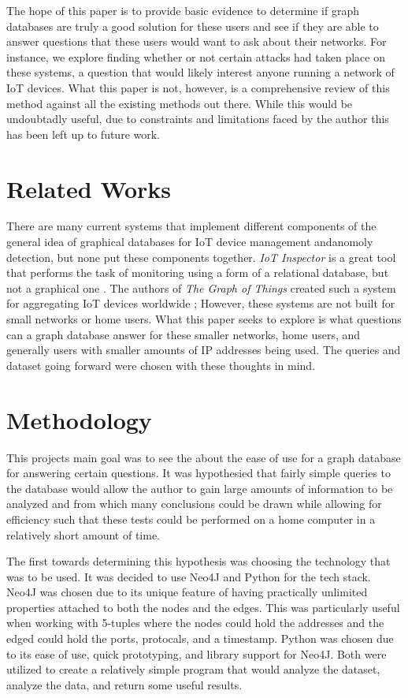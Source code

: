 \documentclass[conference]{IEEEtran}
\begin{document}
The hope of this paper is to provide basic evidence to determine if graph databases are truly a good solution 
for these users and see if they are able to answer questions that these users would want to ask about their 
networks. For instance, we explore finding whether or not certain attacks had taken place on these systems,
a question that would likely interest anyone running a network of IoT devices. What this paper is not, however,
is a comprehensive review of this method against all the existing methods out there. While this would be
undoubtadly useful, due to constraints and limitations faced by the author this has been left up to future work.

\section{Related Works}
There are many current systems that implement different components of the general idea of graphical databases for
IoT device management andanomoly detection, but none put these components together. \textit{IoT Inspector} is a great
tool that performs the task of monitoring using a form of a relational database, but not a graphical one \cite{IoTInspector}.
The authors of \textit{The Graph of Things} created such a system for aggregating IoT devices worldwide \cite{GraphofThings}; 
However, these systems are not built for small networks or home users. What this paper seeks to explore is what questions
can a graph database answer for these smaller networks, home users, and generally users with smaller amounts of
IP addresses being used. The queries and dataset going forward were chosen with these thoughts in mind.
 
\section{Methodology}
This projects main goal was to see the about the ease of use for a graph database for answering certain questions.
It was hypothesied that fairly simple queries to the database would allow the author to gain large amounts of
information to be analyzed and from which many conclusions could be drawn while allowing for efficiency such that
these tests could be performed on a home computer in a relatively short amount of time.

The first towards determining this hypothesis was choosing the technology that was to be used. It was decided 
to use Neo4J and Python for the tech stack. Neo4J was chosen due to its unique feature of having practically 
unlimited properties attached to both the nodes and the edges. This was particularly useful when working with 
5-tuples where the nodes could hold the addresses and the edged could hold the ports, protocals, and a timestamp.
Python was chosen due to its ease of use, quick prototyping, and library support for Neo4J. Both were utilized to
create a relatively simple program that would analyze the dataset, analyze the data, and return some
useful results.
\end{document}

